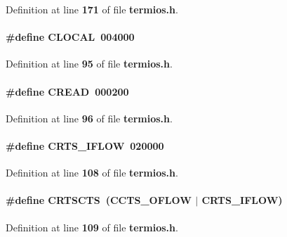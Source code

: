 Definition at line {\bf 171} of file {\bf termios.\+h}.

\paragraph[{C\+L\+O\+C\+AL}]{\setlength{\rightskip}{0pt plus 5cm}\#define C\+L\+O\+C\+AL~004000}\label{termios_8h_a1dec50a32b486302a9414456df4cbb11}


Definition at line {\bf 95} of file {\bf termios.\+h}.

\paragraph[{C\+R\+E\+AD}]{\setlength{\rightskip}{0pt plus 5cm}\#define C\+R\+E\+AD~000200}\label{termios_8h_a8925ebb5550f4c16b5308955eafe469a}


Definition at line {\bf 96} of file {\bf termios.\+h}.

\paragraph[{C\+R\+T\+S\+\_\+\+I\+F\+L\+OW}]{\setlength{\rightskip}{0pt plus 5cm}\#define C\+R\+T\+S\+\_\+\+I\+F\+L\+OW~020000}\label{termios_8h_ab5b0664c1f82f1336dee9df77dc46ef7}


Definition at line {\bf 108} of file {\bf termios.\+h}.

\paragraph[{C\+R\+T\+S\+C\+TS}]{\setlength{\rightskip}{0pt plus 5cm}\#define C\+R\+T\+S\+C\+TS~({\bf C\+C\+T\+S\+\_\+\+O\+F\+L\+OW} $\vert$ {\bf C\+R\+T\+S\+\_\+\+I\+F\+L\+OW})}\label{termios_8h_a6715a4f43f769fe2af371aac8bc3bd7f}


Definition at line {\bf 109} of file {\bf termios.\+h}.

